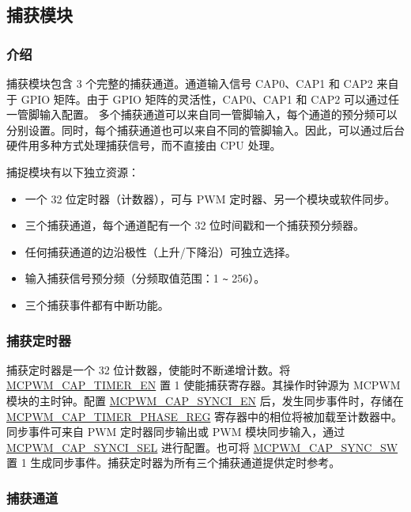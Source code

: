 \documentclass[main\_\_CN.tex]{subfiles}
\begin{document}
\subsection{捕获模块}
\subsubsection{介绍}

捕获模块包含 3 个完整的捕获通道。通道输入信号 CAP0、CAP1 和 CAP2 来自于 GPIO 矩阵。由于 GPIO 矩阵的灵活性，CAP0、CAP1 和 CAP2 可以通过任一管脚输入配置。 多个捕获通道可以来自同一管脚输入，每个通道的预分频可以分别设置。同时，每个捕获通道也可以来自不同的管脚输入。因此，可以通过后台硬件用多种方式处理捕获信号，而不直接由 CPU 处理。

捕捉模块有以下独立资源：
\begin{itemize}
    \item  一个 32 位定时器（计数器），可与 PWM 定时器、另一个模块或软件同步。
    \item 三个捕获通道，每个通道配有一个 32 位时间戳和一个捕获预分频器。
    \item 任何捕获通道的边沿极性（上升/下降沿）可独立选择。
    \item 输入捕获信号预分频（分频取值范围：1 \verb+~+ 256）。
    \item 三个捕获事件都有中断功能。
\end{itemize}

\subsubsection{捕获定时器}
 捕获定时器是一个 32 位计数器，使能时不断递增计数。将 \hyperref[fielddesc:MCPWMCAPTIMEREN]{MCPWM\_CAP\_TIMER\_EN} 置 1 使能捕获寄存器。其操作时钟源为 MCPWM模块的主时钟。配置 \hyperref[fielddesc:MCPWMCAPSYNCIEN]{MCPWM\_CAP\_SYNCI\_EN} 后，发生同步事件时，存储在\\ \hyperref[regdesc:MCPWMCAPTIMERPHASEREG]{MCPWM\_CAP\_TIMER\_PHASE\_REG} 寄存器中的相位将被加载至计数器中。同步事件可来自 PWM 定时器同步输出或 PWM 模块同步输入，通过 \hyperref[fielddesc:MCPWMCAPSYNCISEL]{MCPWM\_CAP\_SYNCI\_SEL} 进行配置。也可将 \hyperref[fielddesc:MCPWMCAPSYNCSW]{MCPWM\_CAP\_SYNC\_SW} 置 1 生成同步事件。捕获定时器为所有三个捕获通道提供定时参考。

\subsubsection{捕获通道}
\end{document}
